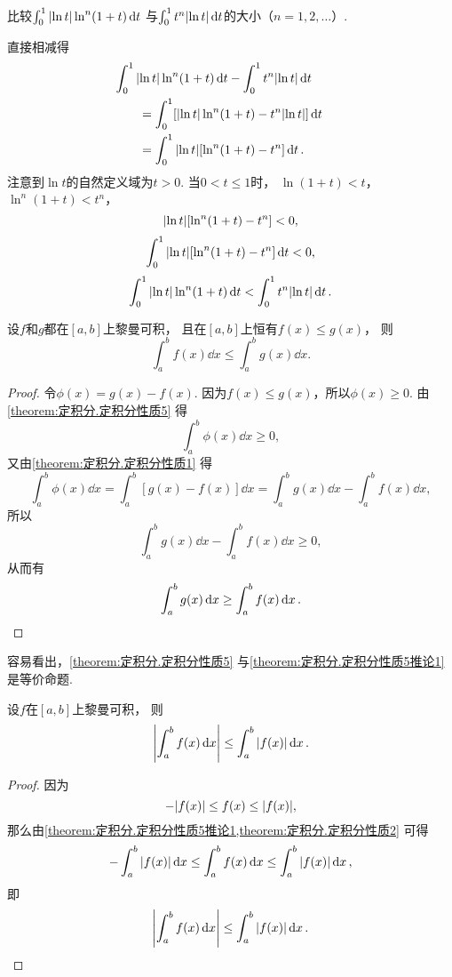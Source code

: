 \begin{example}
比较\(\int_0^1 \abs{\ln t} \ln^n(1+t) \dd{t}\)
与\(\int_0^1 t^n \abs{\ln t} \dd{t}\)的大小（\(n=1,2,\dotsc\)）.
\begin{solution}
直接相减得
\begin{align*}
	&\hspace{-20pt}
	\int_0^1 \abs{\ln t} \ln^n(1+t) \dd{t} - \int_0^1 t^n \abs{\ln t} \dd{t} \\
	&= \int_0^1 [\abs{\ln t} \ln^n(1+t) - t^n \abs{\ln t}] \dd{t} \\
	&= \int_0^1 \abs{\ln t} [\ln^n(1+t) - t^n] \dd{t}.
\end{align*}
注意到\(\ln t\)的自然定义域为\(t > 0\).
当\(0 < t \leq 1\)时，
\(\ln(1+t) < t\)，
\(\ln^n(1+t) < t^n\)，
\[
	\abs{\ln t} [\ln^n(1+t) - t^n] < 0,
\]\[
	\int_0^1 \abs{\ln t} [\ln^n(1+t) - t^n] \dd{t} < 0,
\]\[
	\int_0^1 \abs{\ln t} \ln^n(1+t) \dd{t} < \int_0^1 t^n \abs{\ln t} \dd{t}.
\]
\end{solution}
\end{example}

\begin{corollary}\label{theorem:定积分.定积分性质5推论1}
设\(f\)和\(g\)都在\([a,b]\)上黎曼可积，
且在\([a,b]\)上恒有\(f(x) \leq g(x)\)，
则\[
	\int_a^b f(x) \dd{x} \leq \int_a^b g(x) \dd{x}.
\]
\begin{proof}
令\(\phi(x) = g(x) - f(x)\).
因为\(f(x) \leq g(x)\)，所以\(\phi(x) \geq 0\).
由\cref{theorem:定积分.定积分性质5} 得\[
	\int_a^b \phi(x) \dd{x} \geq 0,
\]
又由\cref{theorem:定积分.定积分性质1} 得\[
	\int_a^b \phi(x) \dd{x}
	= \int_a^b [g(x) - f(x)] \dd{x}
	= \int_a^b g(x) \dd{x} - \int_a^b f(x) \dd{x},
\]
所以\[
	\int_a^b g(x) \dd{x} - \int_a^b f(x) \dd{x} \geq 0,
\]
从而有\[
	\int_a^b g(x) \dd{x} \geq \int_a^b f(x) \dd{x}.
	\qedhere
\]
\end{proof}
\end{corollary}
\begin{remark}
容易看出，\cref{theorem:定积分.定积分性质5} 与\cref{theorem:定积分.定积分性质5推论1} 是等价命题.
\end{remark}

\begin{corollary}\label{theorem:定积分.定积分性质5推论2}
设\(f\)在\([a,b]\)上黎曼可积，
则\begin{equation}
	\abs{\int_a^b f(x) \dd{x}} \leq \int_a^b \abs{f(x)} \dd{x}.
\end{equation}
\begin{proof}
因为\[
	-\abs{f(x)} \leq f(x) \leq \abs{f(x)},
\]
那么由\cref{theorem:定积分.定积分性质5推论1,theorem:定积分.定积分性质2} 可得\[
	-\int_a^b \abs{f(x)} \dd{x}
	\leq
	\int_a^b f(x) \dd{x}
	\leq
	\int_a^b \abs{f(x)} \dd{x},
\]
即\[
	\abs{\int_a^b f(x) \dd{x}} \leq \int_a^b \abs{f(x)} \dd{x}.
	\qedhere
\]
\end{proof}
\end{corollary}


